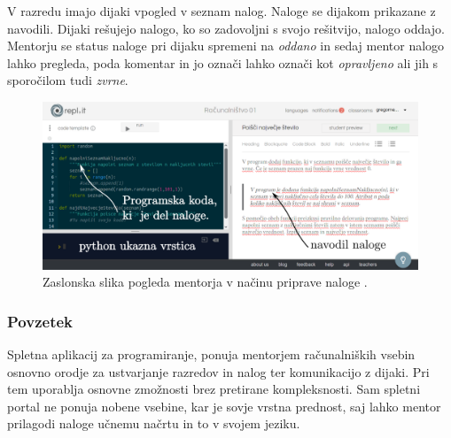 V razredu imajo dijaki vpogled v seznam nalog. Naloge se dijakom
prikazane z navodili. Dijaki rešujejo nalogo, ko so zadovoljni s svojo
rešitvijo, nalogo oddajo. Mentorju se status naloge pri dijaku
spremeni na \emph{oddano} in sedaj mentor nalogo lahko pregleda, poda
komentar in jo označi lahko označi kot \emph{opravljeno} ali jih s
sporočilom tudi \emph{zvrne}.

\begin{figure}[h!]
  \centering
    \includegraphics [width=0.75\linewidth, keepaspectratio =
   1] {./images/sc_web/replIT_assigment-v01.png}
   \caption{Zaslonska slika pogleda mentorja v načinu priprave naloge
     \cite{web:replIT}.}
    \label{fig:web:replIT:assigment}
\end{figure}

\subsubsection{Povzetek}
\label{sec:povzetek:replIT}

Spletna aplikacij za programiranje, ponuja mentorjem računalniških
vsebin osnovno orodje za ustvarjanje razredov in nalog ter
komunikacijo z dijaki. Pri tem uporablja osnovne zmožnosti brez
pretirane kompleksnosti. Sam spletni portal ne ponuja nobene vsebine,
kar je sovje vrstna prednost, saj lahko mentor prilagodi naloge učnemu
načrtu in to v svojem jeziku.

